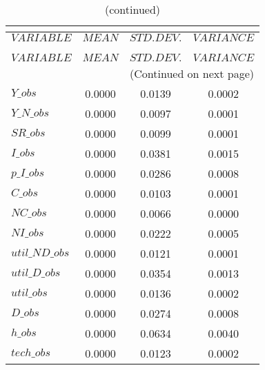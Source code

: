  
\begin{center}
\begin{longtable}{lccc} 
\caption{THEORETICAL MOMENTS}\\
 \label{Table:th_moments}\\
\toprule 
$VARIABLE       $	 & 	 $         MEAN$	 & 	 $    STD. DEV.$	 & 	 $     VARIANCE$\\
\midrule \endfirsthead 
\caption{(continued)}\\
 \toprule \\ 
$VARIABLE       $	 & 	 $         MEAN$	 & 	 $    STD. DEV.$	 & 	 $     VARIANCE$\\
\midrule \endhead 
\midrule \multicolumn{4}{r}{(Continued on next page)} \\ \bottomrule \endfoot 
\bottomrule \endlastfoot 
$Y\_obs         $	 & 	       0.0000	 & 	       0.0139	 & 	       0.0002 \\ 
$Y\_N\_obs      $	 & 	       0.0000	 & 	       0.0097	 & 	       0.0001 \\ 
$SR\_obs        $	 & 	       0.0000	 & 	       0.0099	 & 	       0.0001 \\ 
$I\_obs         $	 & 	       0.0000	 & 	       0.0381	 & 	       0.0015 \\ 
$p\_I\_obs      $	 & 	       0.0000	 & 	       0.0286	 & 	       0.0008 \\ 
$C\_obs         $	 & 	       0.0000	 & 	       0.0103	 & 	       0.0001 \\ 
$NC\_obs        $	 & 	       0.0000	 & 	       0.0066	 & 	       0.0000 \\ 
$NI\_obs        $	 & 	       0.0000	 & 	       0.0222	 & 	       0.0005 \\ 
$util\_ND\_obs  $	 & 	       0.0000	 & 	       0.0121	 & 	       0.0001 \\ 
$util\_D\_obs   $	 & 	       0.0000	 & 	       0.0354	 & 	       0.0013 \\ 
$util\_obs      $	 & 	       0.0000	 & 	       0.0136	 & 	       0.0002 \\ 
$D\_obs         $	 & 	       0.0000	 & 	       0.0274	 & 	       0.0008 \\ 
$h\_obs         $	 & 	       0.0000	 & 	       0.0634	 & 	       0.0040 \\ 
$tech\_obs      $	 & 	       0.0000	 & 	       0.0123	 & 	       0.0002 \\ 
\end{longtable}
 \end{center}
